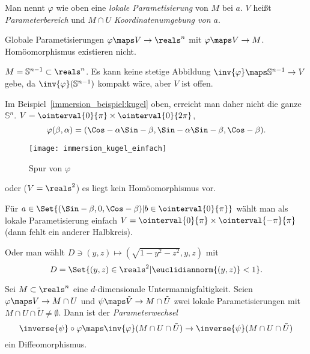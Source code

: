 \begin{bemerkungen*}
  \item Man nennt \( \varphi \) wie oben eine \emph{lokale Parametisierung} von \( M \) bei \( a \). \( V \) heißt \emph{Parameterbereich} und \( M\cap U \) \emph{Koordinatenumgebung von \( a \)}.
  \item Globale Parametisierungen \( \varphi\maps V\to\reals^n \) mit \( \varphi\maps V\to M \). Homöomorphismus existieren \ia nicht.
  \begin{beispiel*}
    \( M=\mathbb{S}^{n-1}\subset \reals^n \). Es kann keine stetige Abbildung \( \inv{\varphi}\maps \mathbb{S}^{n-1}\to V \) gebe, da \( \inv{\varphi}(\mathbb{S}^{n-1}) \) kompakt wäre, aber \( V \) ist offen.
    
    Im Beispiel~\ref{immersion_beispiel:kugel} oben, erreicht man daher nicht die ganze \( \mathbb{S}^n \). \( V=\ointerval{0}{\pi}\times \ointerval{0}{2\pi} \),
    \begin{equation*}
      \varphi(\beta,\alpha)=(\Cos-{\alpha}\Sin-{\beta},\Sin-{\alpha}\Sin-{\beta},\Cos-{\beta}).
    \end{equation*}
    \begin{figure}[H]
      \centering
      \texttt{[image: immersion\_kugel\_einfach]}
      \caption*{Spur von \( \varphi \)}
      \label{fig:immersion_kugel_einfach}
    \end{figure}
    oder (\( V=\reals^2 \)) es liegt kein Homöomorphismus vor.

    Für \( a\in \Set{(\Sin-{\beta},0,\Cos-{\beta})|b\in \ointerval{0}{\pi}} \) wählt man als lokale Parametisierung einfach \( V=\ointerval{0}{\pi}\times \ointerval{-\pi}{\pi} \) (dann fehlt ein anderer Halbkreis).

    Oder man wählt \( D\ni (y,z)\mapsto (\sqrt{1-y^2-z^2},y,z) \) mit
    \begin{equation*}
      D=\Set{(y,z)\in \reals^2|\euclidiannorm{(y,z)}<1}.
    \end{equation*}
  \end{beispiel*}
\end{bemerkungen*}
\begin{satz}[Parameterwechsel]\label{parameterwechsel}
  Sei \( M\subset \reals^n \) eine \( d \)-dimensionale Untermannigfaltigkeit. Seien \( \varphi\maps V\to M\cap U \) und \( \psi\maps \tilde{V}\to M\cap \tilde{U} \) zwei lokale Parametisierungen mit \( M\cap U\cap \tilde{U}\neq \emptyset \). Dann ist der \emph{Parameterwechsel}   
  \begin{equation*}
    \inverse{\psi}\circ \varphi\maps \inv{\varphi}(M\cap U\cap \tilde{U})\to \inverse{\psi}(M\cap U\cap \tilde{U})
  \end{equation*}
  ein Diffeomorphismus.
\end{satz}
